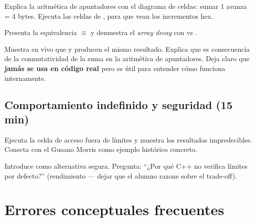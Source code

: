 \documentclass[12pt, oneside]{article}
\begin{document}
Explica la aritmética de apuntadores con el diagrama de celdas: sumar 1
avanza  = 4 bytes. Ejecuta las celdas de ,
 para que vean los incrementos hex.

Presenta la equivalencia  $\equiv$  y demuestra
el \textit{array decay} con  vs .

\begin{notaprofesor}
  Muestra en vivo que  y  producen el mismo resultado.
  Explica que es consecuencia de la conmutatividad de la suma en la aritmética
  de apuntadores. Deja claro que \textbf{jamás se usa en código real} pero
  es útil para entender cómo funciona internamente.
\end{notaprofesor}

\subsection{Comportamiento indefinido y seguridad (15 min)}

Ejecuta la celda de acceso fuera de límites y muestra los resultados
impredecibles. Conecta con el Gusano Morris como ejemplo histórico concreto.

Introduce  como alternativa segura. Pregunta:
``¿Por qué C++ no verifica límites por defecto?'' (rendimiento — dejar que
el alumno razone sobre el trade-off).

\section{Errores conceptuales frecuentes}
\end{document}
